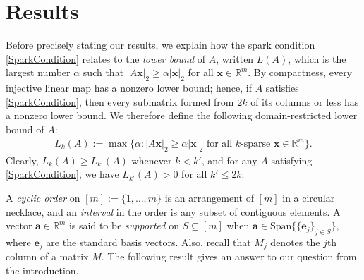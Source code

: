\documentclass[journal, twocolumn]{IEEEtran}
\begin{document}
\section{Results}\label{Results}

Before precisely stating our results, we explain how the spark condition \eqref{SparkCondition} relates to the \emph{lower bound} \cite{Grcar10} of $A$, written $L(A)$, which is the largest number $\alpha$ such that \mbox{$|A\mathbf{x}|_2 \geq \alpha|\mathbf{x}|_2$} for all $\mathbf{x} \in \mathbb{R}^m$. By compactness, every injective linear map has a nonzero lower bound; hence, if $A$ satisfies \eqref{SparkCondition}, then every submatrix formed from $2k$ of its columns or less has a nonzero lower bound. We therefore define the following domain-restricted lower bound of $A$:
\begin{align*}
L_k(A) := \max \{ \alpha : |A\mathbf{x}|_2 \geq \alpha|\mathbf{x}|_2 \text{ for all $k$-sparse } \mathbf{x} \in \mathbb{R}^m\}.
\end{align*} 
Clearly, $L_k(A) \geq L_{k'}(A)$ whenever $k < k'$, and for any $A$ satisfying \eqref{SparkCondition}, we have $L_{k'}(A) > 0$ for all $k' \leq 2k$. 

A \textit{cyclic order} on $[m] := \{1, \ldots,m\}$ is an arrangement of $[m]$ in a circular necklace, and an \textit{interval} in the order is any subset of contiguous elements. A vector $\mathbf{a} \in \mathbb{R}^m$ is said to be \emph{supported} on $S \subseteq [m]$ when $\mathbf{a} \in \text{Span}\{ \{\mathbf{e}_j\}_{j\in S}\}$, where $\mathbf{e}_j$ are the standard basis vectors.  Also, recall that $M_j$ denotes the $j$th column of a matrix $M$. The following result gives an answer to our question from the introduction.
\end{document}
